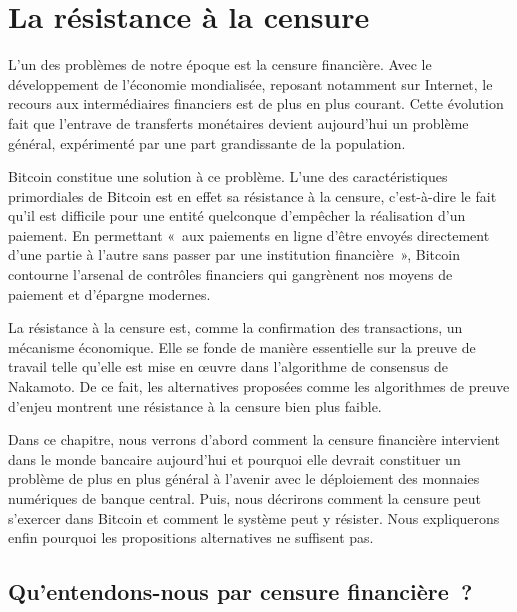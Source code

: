 
\chapter{La résistance à la censure}
\label{ch:censure}

L'un des problèmes de notre époque est la censure financière. Avec le développement de l'économie mondialisée, reposant notamment sur Internet, le recours aux intermédiaires financiers est de plus en plus courant. Cette évolution fait que l'entrave de transferts monétaires devient aujourd'hui un problème général, expérimenté par une part grandissante de la population.

Bitcoin constitue une solution à ce problème. L'une des caractéristiques primordiales de Bitcoin est en effet sa résistance à la censure, c'est-à-dire le fait qu'il est difficile pour une entité quelconque d'empêcher la réalisation d'un paiement. En permettant «~aux paiements en ligne d'être envoyés directement d'une partie à l'autre sans passer par une institution financière~», Bitcoin contourne l'arsenal de contrôles financiers qui gangrènent nos moyens de paiement et d'épargne modernes.

La résistance à la censure est, comme la confirmation des transactions, un mécanisme économique. Elle se fonde de manière essentielle sur la preuve de travail telle qu'elle est mise en œuvre dans l'algorithme de consensus de Nakamoto. De ce fait, les alternatives proposées comme les algorithmes de preuve d'enjeu montrent une résistance à la censure bien plus faible.

Dans ce chapitre, nous verrons d'abord comment la censure financière intervient dans le monde bancaire aujourd'hui et pourquoi elle devrait constituer un problème de plus en plus général à l'avenir avec le déploiement des monnaies numériques de banque central. Puis, nous décrirons comment la censure peut s'exercer dans Bitcoin et comment le système peut y résister. Nous expliquerons enfin pourquoi les propositions alternatives ne suffisent pas.

\section*{Qu'entendons-nous par censure financière~?}

%

